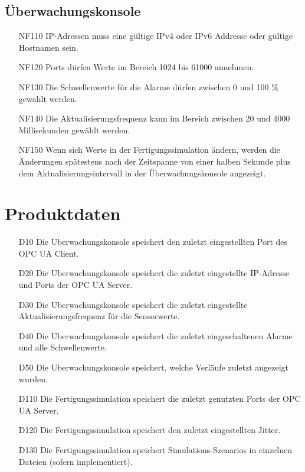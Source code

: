 \documentclass[parskip=full]{scrartcl}
\begin{document}
\subsection{Überwachungskonsole}
\begin{enumerate}
 \item[NF110] IP-Adressen muss eine gültige IPv4 oder IPv6 Addresse oder gültige Hostnamen sein. %
 \item[NF120] Ports dürfen Werte im Bereich 1024 bis 61000 annehmen.
 \item[NF130] Die Schwellenwerte für die Alarme dürfen zwischen 0 und 100 \% gewählt werden.
 \item[NF140] Die Aktualisierungsfrequenz kann im Bereich zwischen 20 und 4000 Millisekunden gewählt werden.
 \item[NF150] Wenn sich Werte in der Fertigungssimulation ändern, werden die Änderungen spätestens nach der Zeitspanne von
   einer halben Sekunde plus dem Aktualisierungsintervall in der Überwachungskonsole angezeigt.
\end{enumerate}

\pagebreak
\section{Produktdaten}
\begin{enumerate}
 \item[D10] Die \gls{Uberwachungskonsole} speichert den zuletzt eingestellten Port des OPC UA Client.
 \item[D20] Die \gls{Uberwachungskonsole} speichert die zuletzt eingestellte IP-Adresse und Ports der OPC UA Server.
 \item[D30] Die \gls{Uberwachungskonsole} speichert die zuletzt eingestellte Aktualisierungsfrequenz für die Sensorwerte.
 \item[D40] Die \gls{Uberwachungskonsole} speichert die zuletzt eingeschaltenen Alarme und alle Schwellenwerte.
 \item[D50] Die \gls{Uberwachungskonsole} speichert, welche Verläufe zuletzt angezeigt wurden.
 \item[D110] Die Fertigungssimulation speichert die zuletzt genutzten Ports der OPC UA Server.
 \item[D120] Die Fertigungssimulation speichert den zuletzt eingestellten \gls{Jitter}.
 \item[D130] Die Fertigungssimulation speichert \glspl{Simulations-Szenario} in einzelnen Dateien (sofern implementiert).
\end{enumerate}
\end{document}
